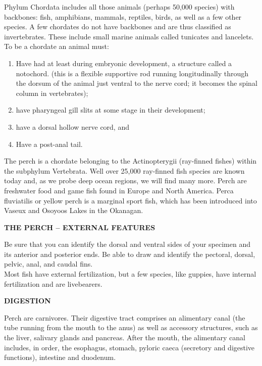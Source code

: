 \documentclass[
]{book}
\providecommand{\tightlist}{%
  \setlength{\itemsep}{0pt}\setlength{\parskip}{0pt}}
\begin{document}
Phylum Chordata includes all those animals (perhaps 50,000 species) with backbones: fish,
amphibians, mammals, reptiles, birds, as well as a few other species. A few chordates do not have backbones and are thus classified as invertebrates. These include small marine animals called tunicates and lancelets. To be a chordate an animal must:

\begin{enumerate}
\def\labelenumi{\arabic{enumi}.}
\tightlist
\item
  Have had at least during embryonic development, a structure called a notochord. (this is a flexible supportive rod running longitudinally through the dorsum of the animal just ventral to the nerve cord; it becomes the spinal column in vertebrates);\\
\item
  have pharyngeal gill slits at some stage in their development;
\item
  have a dorsal hollow nerve cord, and
\item
  Have a post-anal tail.
\end{enumerate}

The perch is a chordate belonging to the Actinopterygii (ray-finned fishes) within the subphylum Vertebrata. Well over 25,000 ray-finned fish species are known today and, as we probe deep ocean regions, we will find many more. Perch are freshwater food and game fish found in Europe
and North America. Perca fluviatilis or yellow perch is a marginal sport fish, which has been introduced into Vaseux and Osoyoos Lakes in the Okanagan.

\textbf{THE PERCH -- EXTERNAL FEATURES}

Be sure that you can identify the dorsal and ventral sides of your specimen and its anterior and
posterior ends. Be able to draw and identify the pectoral, dorsal, pelvic, anal, and caudal fins.\\
Most fish have external fertilization, but a few species, like guppies, have internal fertilization and are livebearers.

\textbf{DIGESTION}

Perch are carnivores. Their digestive tract comprises an alimentary canal (the tube running from the mouth to the anus) as well as accessory structures, such as the liver, salivary glands and pancreas. After the mouth, the alimentary canal includes, in order, the esophagus, stomach, pyloric caeca (secretory and digestive functions), intestine and duodenum.
\end{document}
